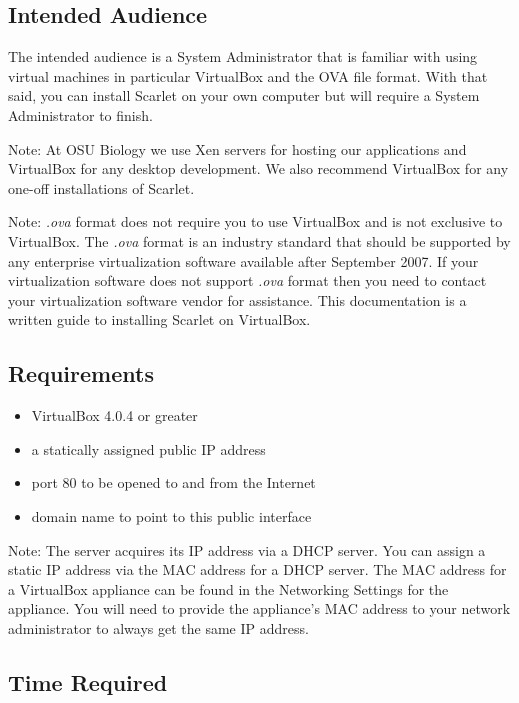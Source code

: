 \documentclass[pdftex,11pt,letterpaper]{article}
\begin{document}
\subsection{Intended Audience}

The intended audience is a System Administrator that is familiar with using virtual machines in particular VirtualBox and the OVA file format.  With that said, you can install Scarlet on your own computer but will require a System Administrator to finish.

Note:
At OSU Biology we use Xen servers for hosting our applications and VirtualBox for any desktop development.  We also recommend VirtualBox for any one-off installations of Scarlet.

Note:
\textit{.ova} format does not require you to use VirtualBox and is not exclusive to VirtualBox.  The \textit{.ova} format is an industry standard that should be supported by any enterprise virtualization software available after September 2007.  If your virtualization software does not support \textit{.ova} format then you need to contact your virtualization software vendor for assistance.  This documentation is a written guide to installing Scarlet on VirtualBox.

\subsection{Requirements}

\begin{itemize}
\item VirtualBox 4.0.4 or greater
\item a statically assigned public IP address 
\item port 80 to be opened to and from the Internet
\item domain name to point to this public interface
\end{itemize}

Note:
The server acquires its IP address via a DHCP server.  You can assign a static IP address via the MAC address for a DHCP server.  The MAC address for a VirtualBox appliance can be found in the Networking Settings for the appliance. You will need to provide the appliance's MAC address to your network administrator to always get the same IP address.

\subsection{Time Required}
\end{document}
